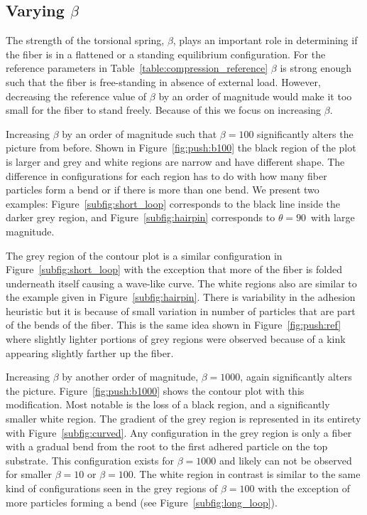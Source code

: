 \subsection{Varying $\beta$}

The strength of the torsional spring, $\beta$, plays an important role in determining if the fiber is in a flattened or a standing equilibrium configuration. For the reference parameters in Table~\ref{table:compression_reference} $\beta$ is strong enough such that the fiber is free-standing in absence of external load. However, decreasing the reference value of $\beta$ by an order of magnitude would make it too small for the fiber to stand freely. Because of this we focus on increasing $\beta$.

Increasing $\beta$ by an order of magnitude such that $\beta=100$ significantly alters the picture from before. Shown in Figure~\ref{fig:push:b100} the black region of the plot is larger and grey and white regions are narrow and have different shape. The difference in configurations for each region has to do with how many fiber particles form a bend or if there is more than one bend. We present two examples: Figure~\ref{subfig:short_loop} corresponds to the black line inside the darker grey region, and Figure~\ref{subfig:hairpin} corresponds to $\theta=90$\textdegree\ with large magnitude.

The grey region of the contour plot is a similar configuration in Figure~\ref{subfig:short_loop} with the exception that more of the fiber is folded underneath itself causing a wave-like curve. The white regions also are similar to the example given in Figure~\ref{subfig:hairpin}. There is variability in the adhesion heuristic but it is because of small variation in number of particles that are part of the bends of the fiber. This is the same idea shown in Figure~\ref{fig:push:ref} where slightly lighter portions of grey regions were observed because of a kink appearing slightly farther up the fiber.

Increasing $\beta$ by another order of magnitude, $\beta=1000$, again significantly alters the picture. Figure~\ref{fig:push:b1000} shows the contour plot with this modification. Most notable is the loss of a black region, and a significantly smaller white region. The gradient of the grey region is represented in its entirety with Figure~\ref{subfig:curved}. Any configuration in the grey region is only a fiber with a gradual bend from the root to the first adhered particle on the top substrate. This configuration exists for $\beta=1000$ and likely can not be observed for smaller $\beta=10$ or $\beta=100$. The white region in contrast is similar to the same kind of configurations seen in the grey regions of $\beta=100$ with the exception of more particles forming a bend (see Figure~\ref{subfig:long_loop}).

